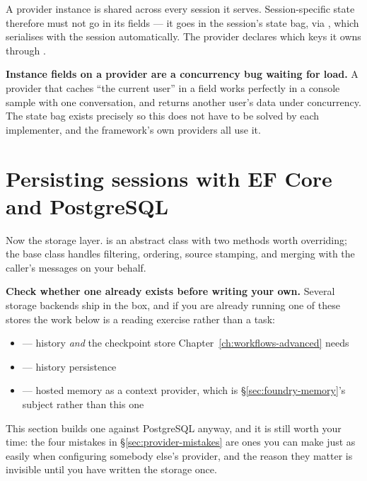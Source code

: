 A provider instance is shared across every session it serves. Session-specific
state therefore must not go in its fields --- it goes in the session's state bag,
via , which serialises with the session
automatically. The provider declares which keys it owns through .

\begin{warning}
\textbf{Instance fields on a provider are a concurrency bug waiting for load.} A
provider that caches ``the current user'' in a field works perfectly in a console
sample with one conversation, and returns another user's data under concurrency.
The state bag exists precisely so this does not have to be solved by each
implementer, and the framework's own providers all use it.
\end{warning}

\section{Persisting sessions with EF Core and PostgreSQL}
\label{sec:ef-provider}

Now the storage layer.  is an abstract class with two
methods worth overriding; the base class handles filtering, ordering, source
stamping, and merging with the caller's messages on your behalf.

\begin{note}
\textbf{Check whether one already exists before writing your own.} Several
storage backends ship in the box, and if you are already running one of these
stores the work below is a reading exercise rather than a task:

\begin{itemize}[leftmargin=1.4em,nosep]
\item {} --- history \emph{and} the checkpoint
      store Chapter~\ref{ch:workflows-advanced} needs
\item {} --- history persistence
\item {} --- hosted memory as a context provider,
      which is \S\ref{sec:foundry-memory}'s subject rather than this one
\end{itemize}

\medskip
This section builds one against PostgreSQL anyway, and it is still worth your
time: the four mistakes in \S\ref{sec:provider-mistakes} are ones you can make
just as easily when configuring somebody else's provider, and the reason they
matter is invisible until you have written the storage once.
\end{note}

